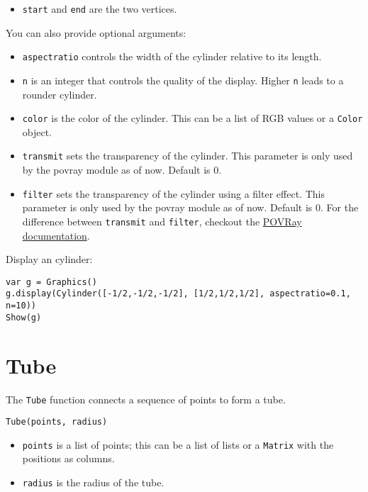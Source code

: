 \begin{itemize}

\item
  \texttt{start} and \texttt{end} are the two vertices.
\end{itemize}

You can also provide optional arguments:

\begin{itemize}

\item
  \texttt{aspectratio} controls the width of the cylinder relative to
  its length.
\item
  \texttt{n} is an integer that controls the quality of the display.
  Higher \texttt{n} leads to a rounder cylinder.
\item
  \texttt{color} is the color of the cylinder. This can be a list of RGB
  values or a \texttt{Color} object.
\item
  \texttt{transmit} sets the transparency of the cylinder. This
  parameter is only used by the povray module as of now. Default is 0.
\item
  \texttt{filter} sets the transparency of the cylinder using a filter
  effect. This parameter is only used by the povray module as of now.
  Default is 0. For the difference between \texttt{transmit} and
  \texttt{filter}, checkout the
  \href{http://xahlee.info/3d/povray-glassy.html}{POVRay documentation}.
\end{itemize}

Display an cylinder:

\begin{lstlisting}
var g = Graphics()
g.display(Cylinder([-1/2,-1/2,-1/2], [1/2,1/2,1/2], aspectratio=0.1, n=10))
Show(g)
\end{lstlisting}

\hypertarget{tube}{%
\section{Tube}\label{tube}}

The \texttt{Tube} function connects a sequence of points to form a tube.

\begin{lstlisting}
Tube(points, radius)
\end{lstlisting}

\begin{itemize}

\item
  \texttt{points} is a list of points; this can be a list of lists or a
  \texttt{Matrix} with the positions as columns.
\item
  \texttt{radius} is the radius of the tube.
\end{itemize}

